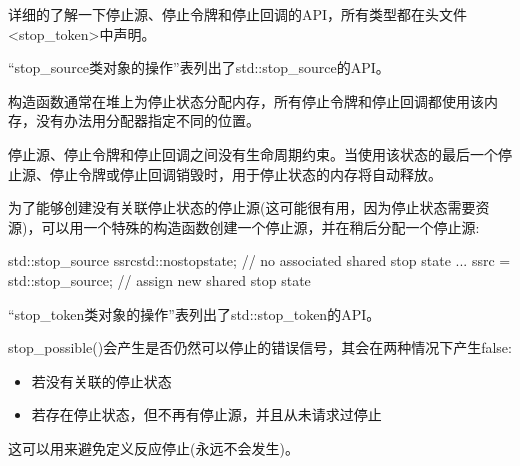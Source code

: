 
详细的了解一下停止源、停止令牌和停止回调的API，所有类型都在头文件<stop\_token>中声明。


“stop\_source类对象的操作”表列出了std::stop\_source的API。

构造函数通常在堆上为停止状态分配内存，所有停止令牌和停止回调都使用该内存，没有办法用分配器指定不同的位置。

停止源、停止令牌和停止回调之间没有生命周期约束。当使用该状态的最后一个停止源、停止令牌或停止回调销毁时，用于停止状态的内存将自动释放。

为了能够创建没有关联停止状态的停止源(这可能很有用，因为停止状态需要资源)，可以用一个特殊的构造函数创建一个停止源，并在稍后分配一个停止源:

\begin{cpp}
std::stop_source ssrc{std::nostopstate}; // no associated shared stop state
...
ssrc = std::stop_source{}; // assign new shared stop state
\end{cpp}



“stop\_token类对象的操作”表列出了std::stop\_token的API。

stop\_possible()会产生是否仍然可以停止的错误信号，其会在两种情况下产生false:

\begin{itemize}
\item
若没有关联的停止状态

\item
若存在停止状态，但不再有停止源，并且从未请求过停止
\end{itemize}

这可以用来避免定义反应停止(永远不会发生)。

